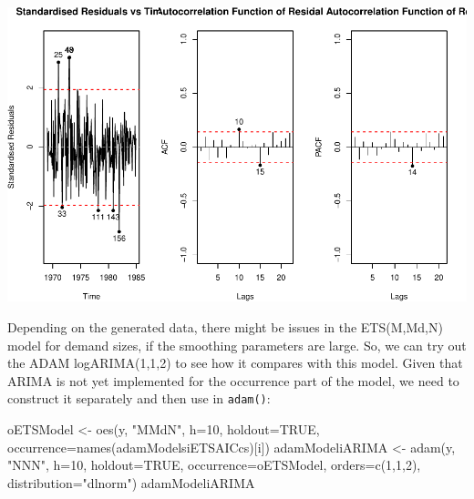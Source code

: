 \documentclass[
]{book}
\newenvironment{Shaded}{\begin{snugshade}}{\end{snugshade}}
\newcommand{\AttributeTok}[1]{\textcolor[rgb]{0.77,0.63,0.00}{#1}}
\newcommand{\ConstantTok}[1]{\textcolor[rgb]{0.00,0.00,0.00}{#1}}
\newcommand{\DecValTok}[1]{\textcolor[rgb]{0.00,0.00,0.81}{#1}}
\newcommand{\FunctionTok}[1]{\textcolor[rgb]{0.00,0.00,0.00}{#1}}
\newcommand{\NormalTok}[1]{#1}
\newcommand{\OtherTok}[1]{\textcolor[rgb]{0.56,0.35,0.01}{#1}}
\newcommand{\SpecialCharTok}[1]{\textcolor[rgb]{0.00,0.00,0.00}{#1}}
\newcommand{\StringTok}[1]{\textcolor[rgb]{0.31,0.60,0.02}{#1}}
\theoremstyle{definition}
\theoremstyle{definition}
\theoremstyle{definition}
\theoremstyle{definition}
\theoremstyle{remark}
\begin{document}
\begin{Shaded}
\end{Shaded}

\includegraphics{adam_files/figure-latex/unnamed-chunk-124-1.pdf}

Depending on the generated data, there might be issues in the ETS(M,Md,N) model for demand sizes, if the smoothing parameters are large. So, we can try out the ADAM logARIMA(1,1,2) to see how it compares with this model. Given that ARIMA is not yet implemented for the occurrence part of the model, we need to construct it separately and then use in \texttt{adam()}:

\begin{Shaded}
\begin{Highlighting}[]
\NormalTok{oETSModel }\OtherTok{\textless{}{-}} \FunctionTok{oes}\NormalTok{(y, }\StringTok{"MMdN"}\NormalTok{, }\AttributeTok{h=}\DecValTok{10}\NormalTok{, }\AttributeTok{holdout=}\ConstantTok{TRUE}\NormalTok{,}
                 \AttributeTok{occurrence=}\FunctionTok{names}\NormalTok{(adamModelsiETSAICcs)[i])}
\NormalTok{adamModeliARIMA }\OtherTok{\textless{}{-}} \FunctionTok{adam}\NormalTok{(y, }\StringTok{"NNN"}\NormalTok{, }\AttributeTok{h=}\DecValTok{10}\NormalTok{, }\AttributeTok{holdout=}\ConstantTok{TRUE}\NormalTok{,}
                        \AttributeTok{occurrence=}\NormalTok{oETSModel,}
                        \AttributeTok{orders=}\FunctionTok{c}\NormalTok{(}\DecValTok{1}\NormalTok{,}\DecValTok{1}\NormalTok{,}\DecValTok{2}\NormalTok{),}
                        \AttributeTok{distribution=}\StringTok{"dlnorm"}\NormalTok{)}
\NormalTok{adamModeliARIMA}
\end{Highlighting}
\end{Shaded}
\end{document}
